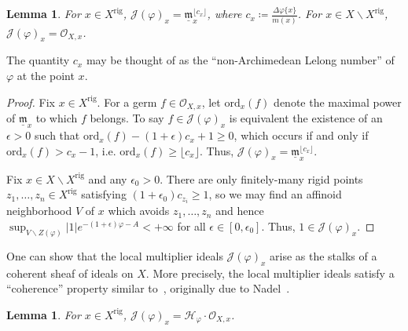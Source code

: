 \documentclass[10pt,reqno]{amsart}
\theoremstyle{plain}
\newtheorem{lemma}[theorem]{Lemma}
\theoremstyle{definition}
\newcommand{\frakm}{\mathfrak{m}}
\newcommand{\ord}{\textrm{ord}}
\renewcommand{\H}{\mathcal{H}}
\numberwithin{equation}{section}
\renewcommand{\O}{\mathcal{O}}
\newcommand{\J}{\mathcal{J}}
\DeclareMathOperator{\rig}{rig}
\begin{document}
\begin{lemma}\label{lemma:local}
For $x \in X^{\rig}$, $\J(\varphi)_x = \underline{\frakm}_x^{\lfloor c_x \rfloor}$, where $c_x \coloneqq  \frac{\Delta \varphi \{x \}}{m(x)}$. For $x \in X \backslash X^{\rig}$, $\J(\varphi)_x = \O_{X,x}$. 
\end{lemma}

The quantity $c_x$
 may be thought of as the ``non-Archimedean Lelong number'' of $\varphi$ at the point $x$.

\begin{proof}
Fix $x \in X^{\rig}$. For a germ $f \in \O_{X,x}$, let $\ord_x(f)$ denote the maximal power of $\underline{\frakm}_x$ to which $f$ belongs. To say $f \in \J(\varphi)_x$ is equivalent the existence of an $\epsilon > 0$ such that $\ord_x(f) - (1+\epsilon)c_x + 1 \geq 0$, which occurs if and only if $\ord_x(f) > c_x - 1$, i.e. $\ord_x(f) \geq \lfloor c_x \rfloor$. Thus, $\J(\varphi)_x = \underline{\frakm}_x^{\lfloor c_x \rfloor}$.

Fix $x \in X \backslash X^{\rig}$ and any $\epsilon_0 > 0$. There are only finitely-many rigid points $z_1,\ldots,z_n \in X^{\rig}$ satisfying $(1+\epsilon_0) c_{z_i} \geq 1$, so we may find an affinoid neighborhood $V$ of $x$ which avoids $z_1,\ldots,z_n$ and hence $\sup_{V\backslash Z(\varphi)} |1|e^{-(1 +\epsilon)\varphi - A} < +\infty$ for all $\epsilon \in [0,\epsilon_0]$. Thus, $1 \in \J(\varphi)_x$. 
\end{proof}

One can show that the local multiplier ideals $\J(\varphi)_x$ arise as the stalks of a coherent sheaf of ideals on $X$. More precisely, the local multiplier ideals satisfy a ``coherence'' property similar to~\cite[Proposition 5.7]{demailly12}, originally due to Nadel~\cite{nadel}.

\begin{lemma}\label{lemma:coherence}
For $x \in X^{\rig}$, $\J(\varphi)_x = \H_{\varphi} \cdot \O_{X,x}$. 
\end{lemma}
\end{document}
